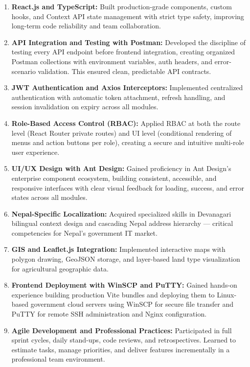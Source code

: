 \documentclass[12pt,a4paper]{report}
\begin{document}
\begin{enumerate}[label=\alph*)]

  \item \textbf{React.js and TypeScript:}
  Built production-grade components, custom hooks, and Context API state management
  with strict type safety, improving long-term code reliability and team collaboration.

  \item \textbf{API Integration and Testing with Postman:}
  Developed the discipline of testing every API endpoint before frontend integration,
  creating organized Postman collections with environment variables, auth headers,
  and error-scenario validation. This ensured clean, predictable API contracts.

  \item \textbf{JWT Authentication and Axios Interceptors:}
  Implemented centralized authentication with automatic token attachment, refresh
  handling, and session invalidation on expiry across all modules.

  \item \textbf{Role-Based Access Control (RBAC):}
  Applied RBAC at both the route level (React Router private routes) and UI level
  (conditional rendering of menus and action buttons per role), creating a secure
  and intuitive multi-role user experience.

  \item \textbf{UI/UX Design with Ant Design:}
  Gained proficiency in Ant Design's enterprise component ecosystem, building
  consistent, accessible, and responsive interfaces with clear visual feedback
  for loading, success, and error states across all modules.

  \item \textbf{Nepal-Specific Localization:}
  Acquired specialized skills in Devanagari bilingual context design and cascading
  Nepal address hierarchy --- critical competencies for Nepal's government IT market.

  \item \textbf{GIS and Leaflet.js Integration:}
  Implemented interactive maps with polygon drawing, GeoJSON storage, and
  layer-based land type visualization for agricultural geographic data.

  \item \textbf{Frontend Deployment with WinSCP and PuTTY:}
  Gained hands-on experience building production Vite bundles and deploying them
  to Linux-based government cloud servers using WinSCP for secure file transfer
  and PuTTY for remote SSH administration and Nginx configuration.

  \item \textbf{Agile Development and Professional Practices:}
  Participated in full sprint cycles, daily stand-ups, code reviews, and retrospectives.
  Learned to estimate tasks, manage priorities, and deliver features incrementally
  in a professional team environment.

\end{enumerate}
\end{document}
